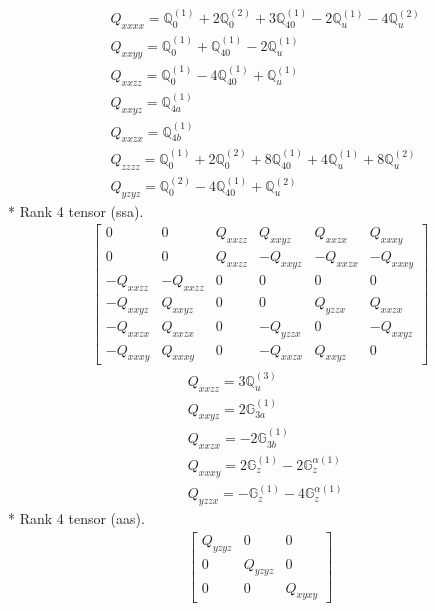\documentclass[fleqn,8pt,landscape]{jsarticle}
\begin{document}
\begin{align*}
& Q_{xxxx} = \mathbb{Q}_{0}^{(1)} + 2 \mathbb{Q}_{0}^{(2)} + 3 \mathbb{Q}_{40}^{(1)} - 2 \mathbb{Q}_{u}^{(1)} - 4 \mathbb{Q}_{u}^{(2)} \\
& Q_{xxyy} = \mathbb{Q}_{0}^{(1)} + \mathbb{Q}_{40}^{(1)} - 2 \mathbb{Q}_{u}^{(1)} \\
& Q_{xxzz} = \mathbb{Q}_{0}^{(1)} - 4 \mathbb{Q}_{40}^{(1)} + \mathbb{Q}_{u}^{(1)} \\
& Q_{xxyz} = \mathbb{Q}_{4a}^{(1)} \\
& Q_{xxzx} = \mathbb{Q}_{4b}^{(1)} \\
& Q_{zzzz} = \mathbb{Q}_{0}^{(1)} + 2 \mathbb{Q}_{0}^{(2)} + 8 \mathbb{Q}_{40}^{(1)} + 4 \mathbb{Q}_{u}^{(1)} + 8 \mathbb{Q}_{u}^{(2)} \\
& Q_{yzyz} = \mathbb{Q}_{0}^{(2)} - 4 \mathbb{Q}_{40}^{(1)} + \mathbb{Q}_{u}^{(2)}
\end{align*}
* Rank 4 tensor (ssa).
\begin{align*}
\begin{bmatrix} 0 & 0 & Q_{xxzz} & Q_{xxyz} & Q_{xxzx} & Q_{xxxy} \\ 0 & 0 & Q_{xxzz} & - Q_{xxyz} & - Q_{xxzx} & - Q_{xxxy} \\ - Q_{xxzz} & - Q_{xxzz} & 0 & 0 & 0 & 0 \\ - Q_{xxyz} & Q_{xxyz} & 0 & 0 & Q_{yzzx} & Q_{xxzx} \\ - Q_{xxzx} & Q_{xxzx} & 0 & - Q_{yzzx} & 0 & - Q_{xxyz} \\ - Q_{xxxy} & Q_{xxxy} & 0 & - Q_{xxzx} & Q_{xxyz} & 0 \end{bmatrix}
\end{align*}
\begin{align*}
& Q_{xxzz} = 3 \mathbb{Q}_{u}^{(3)} \\
& Q_{xxyz} = 2 \mathbb{G}_{3a}^{(1)} \\
& Q_{xxzx} = - 2 \mathbb{G}_{3b}^{(1)} \\
& Q_{xxxy} = 2 \mathbb{G}_{z}^{(1)} - 2 \mathbb{G}_{z}^{\alpha(1)} \\
& Q_{yzzx} = - \mathbb{G}_{z}^{(1)} - 4 \mathbb{G}_{z}^{\alpha(1)}
\end{align*}
* Rank 4 tensor (aas).
\begin{align*}
\begin{bmatrix} Q_{yzyz} & 0 & 0 \\ 0 & Q_{yzyz} & 0 \\ 0 & 0 & Q_{xyxy} \end{bmatrix}
\end{align*}
\end{document}
